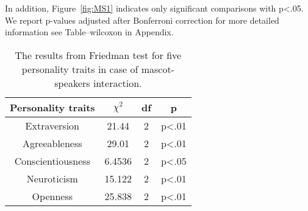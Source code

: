 In addition, Figure~\ref{fig:MS1} indicates only significant comparisons with p<.05.
We report p-values adjusted after Bonferroni correction for more
detailed information see Table--wilcoxon in Appendix.

\begin{table}[H]
    \renewcommand{\arraystretch}{1}
    \begin{center}
        \begin{tabular}{|c|c|c|c|}
            \hline
            \textbf{Personality traits} & \textbf{$\chi^2$} & \textbf{df} & \textbf{p} \\
            \hline
            Extraversion &21.44 &2 &p<.01 \\
            \hline
            Agreeableness &29.01 &2 &p<.01\\
            \hline
            Conscientiousness &6.4536 &2 &p<.05\\
            \hline
            Neuroticism &15.122 &2 &p<.01 \\
            \hline
            Openness &25.838 &2 &p<.01 \\
            \hline
        \end{tabular}
        \caption{The results from Friedman test for five personality traits in case of mascot-speakers interaction.}
        \label{table:friedmanMS1}
    \end{center}
\end{table}

